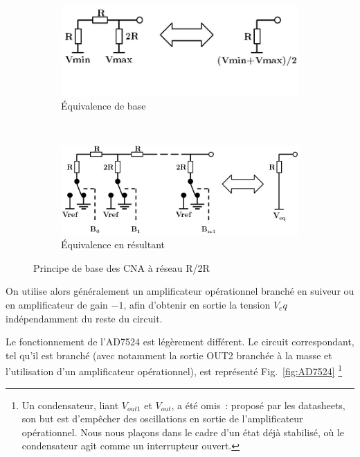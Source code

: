 \documentclass{article}
\begin{document}
\begin{figure}[h]
  \centering
  \begin{subfigure}[b]{0.43\textwidth}
    \centering
    \includegraphics[width=\textwidth]{R2Rbasics}
    \caption{Équivalence de base}
    \label{fig:R2Rbase1}
  \end{subfigure}
  ~~~~
  \begin{subfigure}[b]{0.53\textwidth}
    \centering
    \includegraphics[width=\textwidth]{R2Rexpended}
    \caption{Équivalence en résultant}
    \label{fig:R2Rbase2}
  \end{subfigure}
  \caption{Principe de base des CNA à réseau R/2R}
\end{figure}

On utilise alors généralement un amplificateur opérationnel branché en suiveur ou en amplificateur de gain $-1$, afin d'obtenir en sortie la tension $V_eq$ indépendamment du reste du circuit.


Le fonctionnement de l'AD7524 est légèrement différent. Le circuit correspondant, tel qu'il est branché (avec notamment la sortie OUT2 branchée à la masse et l'utilisation d'un amplificateur opérationnel), est représenté Fig.~\ref{fig:AD7524} \footnote{Un condensateur, liant $V_{out1}$ et $V_{out}$, a été omis~: proposé par les datasheets, son but est d'empêcher des oscillations en sortie de l'amplificateur opérationnel. Nous nous plaçons dans le cadre d'un état déjà stabilisé, où le condensateur agit comme un interrupteur ouvert.}
\end{document}
